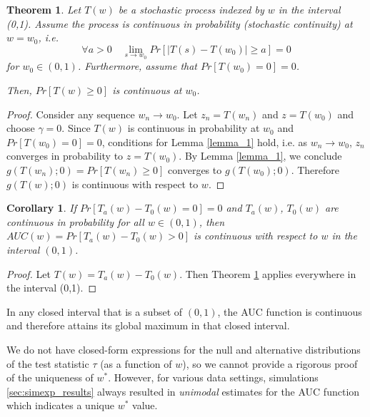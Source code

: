 \documentclass[12pt,oneside,final]{thesis}\usepackage[]{graphicx}\usepackage[]{color}
\newtheorem{thm}{Theorem}
\newtheorem{cor}{Corollary}
\begin{document}
\begin{thm} \label{main_thm}
Let $T(w)$ be  a stochastic process indexed by $w$ in the interval (0,1). Assume  the process is continuous in probability  (stochastic continuity)   at $w=w_0$,  i.e.
\begin{equation} \forall a>0 \quad  \lim_{s \rightarrow w_0} Pr\left[\left|T(s)-T(w_0) \right| \geq a \right] = 0 
\end{equation}
for $ w_0\in (0,1)$. Furthermore, assume that $Pr\left[T(w_0)=0\right]=0$.

Then, $Pr \left[ T(w) \geq 0\right]$ is continuous at $w_0$.
\end{thm}

\begin{proof}
Consider any sequence $w_n \rightarrow w_0$. Let $z_n = T(w_n)$ and  $z=T(w_0)$ and choose $\gamma=0$. Since $T(w)$ is continuous in probability at $w_0$ and $Pr\left[T(w_0)=0\right]=0$, conditions for Lemma \ref{lemma_1} hold, i.e.\hspace{-.5em} as $w_n\rightarrow w_0$, $z_n$ converges in probability to $z=T(w_0)$. By  Lemma \ref{lemma_1}, we conclude  $g(T(w_n); 0 ) = Pr \left[ T(w_n) \geq 0\right]$ converges to $g(T(w_0);0)$. Therefore $g(T(w);0)$ is continuous with respect to $w$.
\end{proof}


\begin{cor}{
 If $Pr[T_a(w)-T_0(w)=0]=0$ and $T_a(w)$, $T_0(w)$ are continuous in probability for all $w \in (0,1)$, then $AUC(w)=Pr\left[T_a(w)-T_0(w) >0 \right]$ is continuous with respect to $w$  in the interval $(0,1)$.}
\end{cor}
\begin{proof}

Let $T(w)=T_a(w)-T_0(w).$ Then Theorem \ref{main_thm} applies everywhere in the interval (0,1).
\end{proof}

In any closed interval that is a subset of $(0,1)$, the AUC function is continuous and therefore attains its global maximum in that closed interval.

 We do not have closed-form expressions for the null and alternative distributions of the test statistic $\tau$ (as a function of  $w$), so we cannot provide a rigorous proof of the uniqueness of $w^*$. However, for various data settings, simulations \ref{sec:simexp_results} always resulted in \emph{unimodal}  estimates for the AUC function which indicates a unique $w^*$ value.
\end{document}
